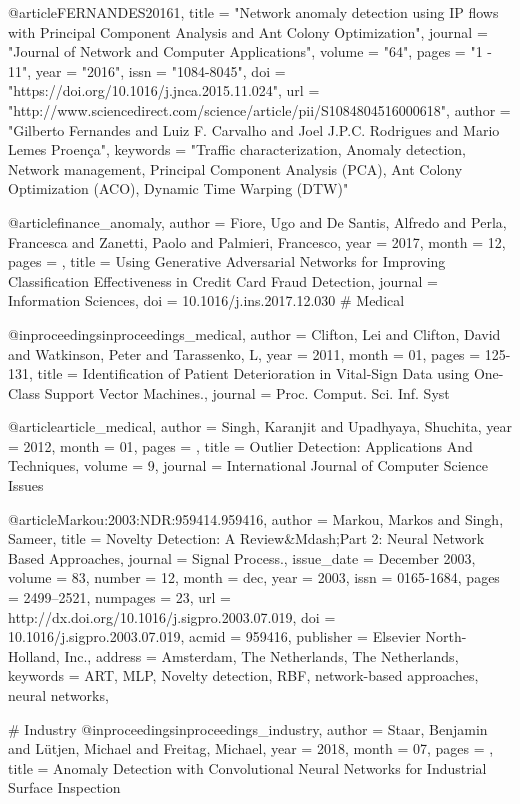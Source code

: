 @article{FERNANDES20161,
title = "Network anomaly detection using IP flows with Principal Component Analysis and Ant Colony Optimization",
journal = "Journal of Network and Computer Applications",
volume = "64",
pages = "1 - 11",
year = "2016",
issn = "1084-8045",
doi = "https://doi.org/10.1016/j.jnca.2015.11.024",
url = "http://www.sciencedirect.com/science/article/pii/S1084804516000618",
author = "Gilberto Fernandes and Luiz F. Carvalho and Joel J.P.C. Rodrigues and Mario Lemes Proença",
keywords = "Traffic characterization, Anomaly detection, Network management, Principal Component Analysis (PCA), Ant Colony Optimization (ACO), Dynamic Time Warping (DTW)"
}

@article{finance_anomaly,
author = {Fiore, Ugo and De Santis, Alfredo and Perla, Francesca and Zanetti, Paolo and Palmieri, Francesco},
year = {2017},
month = {12},
pages = {},
title = {Using Generative Adversarial Networks for Improving Classification Effectiveness in Credit Card Fraud Detection},
journal = {Information Sciences},
doi = {10.1016/j.ins.2017.12.030}
}
# Medical 

@inproceedings{inproceedings_medical,
author = {Clifton, Lei and Clifton, David and Watkinson, Peter and Tarassenko, L},
year = {2011},
month = {01},
pages = {125-131},
title = {Identification of Patient Deterioration in Vital-Sign Data using One-Class Support Vector Machines.},
journal = {Proc. Comput. Sci. Inf. Syst}
}

@article{article_medical,
author = {Singh, Karanjit and Upadhyaya, Shuchita},
year = {2012},
month = {01},
pages = {},
title = {Outlier Detection: Applications And Techniques},
volume = {9},
journal = {International Journal of Computer Science Issues}
}

@article{Markou:2003:NDR:959414.959416,
 author = {Markou, Markos and Singh, Sameer},
 title = {Novelty Detection: A Review\&Mdash;Part 2: Neural Network Based Approaches},
 journal = {Signal Process.},
 issue_date = {December 2003},
 volume = {83},
 number = {12},
 month = dec,
 year = {2003},
 issn = {0165-1684},
 pages = {2499--2521},
 numpages = {23},
 url = {http://dx.doi.org/10.1016/j.sigpro.2003.07.019},
 doi = {10.1016/j.sigpro.2003.07.019},
 acmid = {959416},
 publisher = {Elsevier North-Holland, Inc.},
 address = {Amsterdam, The Netherlands, The Netherlands},
 keywords = {ART, MLP, Novelty detection, RBF, network-based approaches, neural networks},
} 



# Industry
@inproceedings{inproceedings_industry,
author = {Staar, Benjamin and Lütjen, Michael and Freitag, Michael},
year = {2018},
month = {07},
pages = {},
title = {Anomaly Detection with Convolutional Neural Networks for Industrial Surface Inspection}
}


